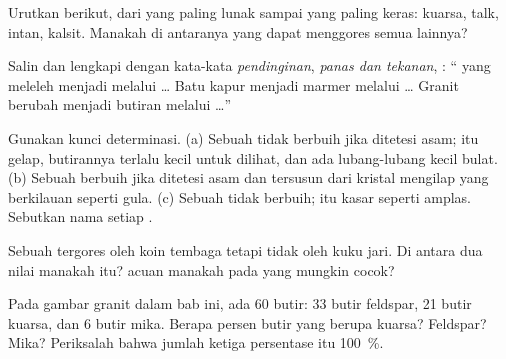 \begin{exercise}[$\star$]\label{exo:g6:rocks-and-minerals:3}
Urutkan  berikut, dari yang paling lunak sampai yang paling
keras: kuarsa, talk, intan, kalsit. Manakah di antaranya yang dapat
menggores semua  lainnya?
\end{exercise}

\begin{exercise}[$\star$]\label{exo:g6:rocks-and-minerals:4}
Salin dan lengkapi dengan kata-kata \emph{pendinginan}, \emph{panas dan
tekanan}, \emph{}: `` yang meleleh menjadi 
melalui \ldots{} Batu kapur menjadi marmer melalui \ldots{} Granit berubah
menjadi butiran  melalui \ldots''
\end{exercise}

\begin{exercise}[$\star\star$]\label{exo:g6:rocks-and-minerals:5}
Gunakan kunci determinasi. (a) Sebuah  tidak berbuih jika ditetesi
asam;  itu gelap, butirannya terlalu kecil untuk dilihat, dan ada
lubang-lubang kecil bulat. (b) Sebuah  berbuih jika ditetesi asam dan
tersusun dari kristal mengilap yang berkilauan seperti gula. (c) Sebuah
 tidak berbuih;  itu kasar seperti amplas. Sebutkan nama
setiap .
\end{exercise}

\begin{exercise}[$\star\star$]\label{exo:g6:rocks-and-minerals:6}
Sebuah  tergores oleh koin tembaga tetapi tidak oleh kuku jari. Di
antara dua nilai  manakah  itu?  acuan manakah pada
 yang mungkin cocok?
\end{exercise}

\begin{exercise}[$\star\star$]\label{exo:g6:rocks-and-minerals:7}
Pada gambar granit dalam bab ini, ada 60 butir: 33 butir feldspar, 21 butir
kuarsa, dan 6 butir mika. Berapa persen butir yang berupa kuarsa? Feldspar?
Mika? Periksalah bahwa jumlah ketiga persentase itu 100~\%.
\end{exercise}

